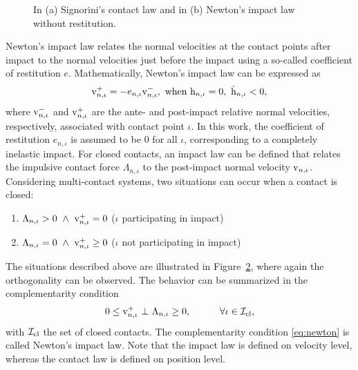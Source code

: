 \documentclass[../DC2017114Bouma.tex]{subfiles}
\begin{document}
\begin{figure}[bt!]
\begin{subfigure}{0.3\textwidth}
\caption{}\label{fig:newtonimpact}
\end{subfigure}
\caption{In \textnormal{(a)} Signorini's contact law and in \textnormal{(b)} Newton's impact law without restitution.}
\end{figure}
Newton's impact law relates the normal velocities at the contact points after impact to the normal velocities just before the impact using a so-called coefficient of restitution $e$. Mathematically, Newton's impact law can be expressed as
\begin{align}
\mathrm{v}^+_{n,\iota} = -e_{n,\iota}\mathrm{v}^-_{n,\iota},\text{ when }\mathrm{h}_{n,\iota}=0,\ \dot{\mathrm{h}}_{n,\iota}<0,
\end{align}
%
%
where $\mathrm{v}^-_{n,\iota}$ and $\mathrm{v}^+_{n,\iota}$ are the ante- and post-impact relative normal velocities, respectively, associated with contact point $\iota$. In this work, the coefficient of restitution $e_{n,\iota}$ is assumed to be $0$ for all $\iota$, corresponding to a completely inelastic impact. For closed contacts, an impact law can be defined that relates the impulsive contact force $\Lambda_{n,\iota}$ to the post-impact normal velocity $\mathrm{v}_{n,\iota}$. Considering multi-contact systems, two situations can occur when a contact is closed:
\begin{enumerate}
\item $\Lambda_{n,\iota} > 0\ \wedge\ \vrm^+_{n,\iota} = 0$ ($\iota$ participating in impact)
\item $\Lambda_{n,\iota} = 0\ \wedge\ \vrm^+_{n,\iota} \geq 0$ ($\iota$ not participating in impact)
\end{enumerate}
The situations described above are illustrated in Figure~\ref{fig:newtonimpact}, where again the orthogonality can be observed. The behavior can be summarized in the complementarity condition
\begin{align}
0\leq \mathrm{v}^+_{n,\iota}\ \bot\ \Lambda_{n,\iota} \geq 0,\quad  \qquad \forall \iota\in\mathcal{I}_{\text{cl}},\label{eq:newton}
\end{align}
with $\mathcal{I}_{\text{cl}}$ the set of closed contacts. The complementarity condition \eqref{eq:newton} is called Newton's impact law. Note that the impact law is defined on velocity level, whereas the contact law is defined on position level.
\end{document}
